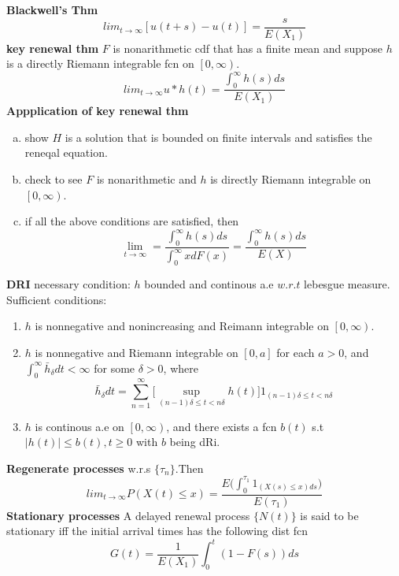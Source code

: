 \documentclass{amsart}
\theoremstyle{plain}
\theoremstyle{definition}
\begin{document}
\textbf{Blackwell's Thm} 
\[ lim_{t\to \infty}[u(t+s)-u(t)] = \frac{s}{E(X_1)} \]
\textbf{key renewal thm} $F$ is nonarithmetic cdf that has a finite mean and suppose $h$ is a directly Riemann integrable fcn on $\left.\left[0, \infty\right)\right.$.
\[lim_{t\to \infty} u*h(t) = \frac{\int_{0}^{\infty}h(s)ds}{E(X_1)} \]
\textbf{Appplication of key renewal thm} 
\begin{enumerate}[(a)]
  \item
	show $H$ is a solution that is bounded on finite intervals and satisfies the reneqal equation.
  \item
	check to see $F$ is nonarithmetic and $h$ is directly Riemann integrable on $\left.\left[0, \infty\right)\right.$. 
  \item if all the above conditions are satisfied, then 
	\[\lim_{t\to \infty} = \frac{\int_0^{\infty}h(s)ds}{\int_0^{\infty}xdF(x)} = \frac{\int_0^{\infty}h(s)ds}{E(X)}\]
  \end{enumerate}
\textbf{DRI} necessary condition: $h$ bounded and continous a.e $w.r.t$ lebesgue measure. \\
Sufficient conditions: 
\begin{enumerate}
  \item
	$h$ is nonnegative and nonincreasing and Reimann integrable on $\left.\left[0, \infty\right)\right.$.
  \item 
	$h$ is nonnegative and Riemann integrable on $[0,a]$ for each $a>0$, and $\int_{0}^{\infty}\bar{h}_{\delta}dt < \infty$ for some $\delta > 0$, where 
	\[\bar{h}_{\delta}dt = \sum_{n=1}^{\infty}\Big[\sup_{(n-1)\delta \leq t < n\delta} h(t)\Big] 1_{(n-1)\delta \leq t < n\delta}\]
  \item 
	$h$ is continous a.e on $\left.\left[0, \infty\right)\right.$, and there exists a fcn $b(t)$ s.t $|h(t)| \leq b(t), t\geq 0$ with $b$ being dRi.
  \end{enumerate}
\textbf{Regenerate processes} w.r.s $\{\tau_n\}$.Then
\[lim_{t\to \infty}P(X(t) \leq x) = \frac{E\Big(\int_{0}^{\tau_1}1_{(X(s) \leq x)ds}\Big)}{E(\tau_1)}\]
\textbf{Stationary processes} A delayed renewal process $\{N(t)\}$ is said to be stationary iff the initial arrival times has the following dist fcn 
\[G(t)= \frac{1}{E(X_1)}\int_{0}^{t}(1-F(s))ds\]
\end{document}
